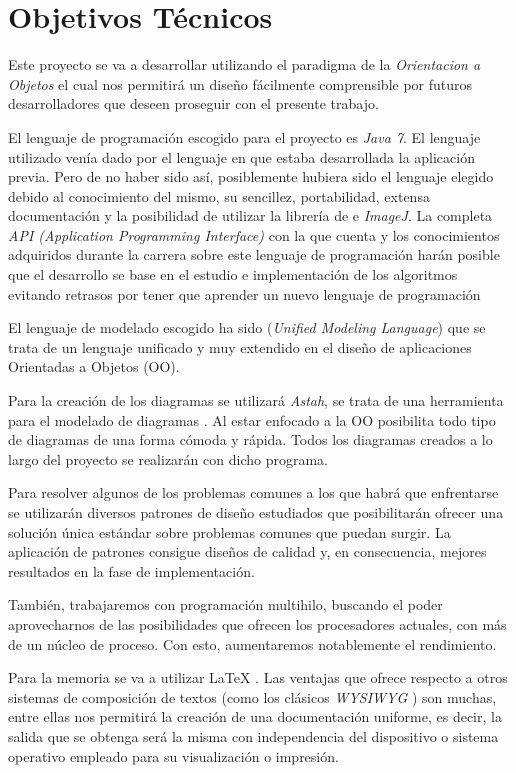 \section{Objetivos Técnicos}
Este proyecto se va a desarrollar utilizando el paradigma de la \textit{Orientacion a Objetos} el cual nos permitirá un diseño fácilmente comprensible por futuros desarrolladores que deseen proseguir con el presente trabajo. 

El lenguaje de programación escogido para el proyecto es \textit{Java 7}. El lenguaje utilizado venía dado por el lenguaje en que estaba desarrollada la aplicación previa. Pero de no haber sido así, posiblemente hubiera sido el lenguaje elegido debido al conocimiento del mismo, su sencillez, portabilidad, extensa documentación y la posibilidad de utilizar la librería de \weka{} e \textit{ImageJ}. La completa \textit{API (Application Programming Interface)} con la que cuenta y los conocimientos adquiridos durante la carrera sobre este lenguaje de programación harán posible que el desarrollo se base en el estudio e implementación de los algoritmos evitando retrasos por tener que aprender un nuevo lenguaje de programación

El lenguaje de modelado escogido ha sido \uml{} (\textit{Unified Modeling Language}) que se trata de un lenguaje unificado y muy extendido en el diseño de aplicaciones Orientadas a Objetos (OO).

Para la creación de los diagramas se utilizará \textit{Astah}, se trata de una herramienta para el modelado de diagramas \uml{}. Al estar enfocado a la OO posibilita todo tipo de diagramas de una forma cómoda y rápida. Todos los diagramas creados a lo largo del proyecto se realizarán con dicho programa.

Para resolver algunos de los problemas comunes a los que habrá que enfrentarse se utilizarán diversos patrones de diseño \cite{patrones} estudiados que posibilitarán ofrecer una solución única estándar sobre problemas comunes que puedan surgir. La aplicación de patrones consigue diseños de calidad y, en consecuencia, mejores resultados en la fase de implementación.

También, trabajaremos con programación multihilo, buscando el poder aprovecharnos de las posibilidades que ofrecen los procesadores actuales, con más de un núcleo de proceso. Con esto, aumentaremos notablemente el rendimiento.

Para la memoria se va a utilizar \LaTeX{} \cite{definicion_latex}. Las ventajas que ofrece respecto a otros sistemas de composición de textos (como los clásicos \textit{WYSIWYG} \cite{wysiwyg}) son muchas, entre ellas nos permitirá la creación de una documentación uniforme, es decir, la salida que se obtenga será la misma con independencia del dispositivo o sistema operativo empleado para su visualización o impresión.

